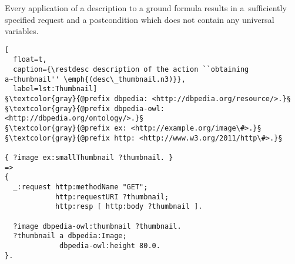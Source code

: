 \begin{corollary}
\label{corollary}
Every application of a \restdesc description to a ground formula results in a~sufficiently specified \http request 
and a postcondition which does not contain any universal variables.
\end{corollary}


\begin{lstlisting}[
  float=t,
  caption={\restdesc description of the action ``obtaining a~thumbnail'' \emph{(desc\_thumbnail.n3)}},
  label=lst:Thumbnail]
§\textcolor{gray}{@prefix dbpedia: <http://dbpedia.org/resource/>.}§
§\textcolor{gray}{@prefix dbpedia-owl: <http://dbpedia.org/ontology/>.}§
§\textcolor{gray}{@prefix ex: <http://example.org/image\#>.}§
§\textcolor{gray}{@prefix http: <http://www.w3.org/2011/http\#>.}§

{ ?image ex:smallThumbnail ?thumbnail. }
=>
{
  _:request http:methodName "GET";
            http:requestURI ?thumbnail;
            http:resp [ http:body ?thumbnail ].

  ?image dbpedia-owl:thumbnail ?thumbnail.
  ?thumbnail a dbpedia:Image;
             dbpedia-owl:height 80.0.
}.
\end{lstlisting}

